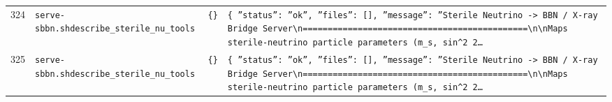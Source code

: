 \documentclass[11pt,a4paper]{article}
\begin{document}
\begin{longtable}{@{}p{}p{}p{}p{}@{}}
324 & \texttt{serve-sbbn.sh}\newline\texttt{describe\_\allowbreak{}sterile\_\allowbreak{}nu\_\allowbreak{}tools} & \texttt{\{\}\allowbreak{}} & \texttt{\{   ''status'':\allowbreak{} ''ok'',\allowbreak{}   ''files'':\allowbreak{} []\allowbreak{},\allowbreak{}   ''message'':\allowbreak{} ''Sterile Neutrino -\textgreater{}\allowbreak{} BBN /\allowbreak{} X-ray Bridge Server\textbackslash{}\allowbreak{}n=\allowbreak{}=\allowbreak{}=\allowbreak{}=\allowbreak{}=\allowbreak{}=\allowbreak{}=\allowbreak{}=\allowbreak{}=\allowbreak{}=\allowbreak{}=\allowbreak{}=\allowbreak{}=\allowbreak{}=\allowbreak{}=\allowbreak{}=\allowbreak{}=\allowbreak{}=\allowbreak{}=\allowbreak{}=\allowbreak{}=\allowbreak{}=\allowbreak{}=\allowbreak{}=\allowbreak{}=\allowbreak{}=\allowbreak{}=\allowbreak{}=\allowbreak{}=\allowbreak{}=\allowbreak{}=\allowbreak{}=\allowbreak{}=\allowbreak{}=\allowbreak{}=\allowbreak{}=\allowbreak{}=\allowbreak{}=\allowbreak{}=\allowbreak{}=\allowbreak{}=\allowbreak{}=\allowbreak{}=\allowbreak{}=\allowbreak{}=\allowbreak{}\textbackslash{}\allowbreak{}n\textbackslash{}\allowbreak{}nMaps sterile-neutrino particle parameters (m\_\allowbreak{}s,\allowbreak{} sin\textasciicircum{}\allowbreak{}2 2\ldots{}\allowbreak{}} \\
325 & \texttt{serve-sbbn.sh}\newline\texttt{describe\_\allowbreak{}sterile\_\allowbreak{}nu\_\allowbreak{}tools} & \texttt{\{\}\allowbreak{}} & \texttt{\{   ''status'':\allowbreak{} ''ok'',\allowbreak{}   ''files'':\allowbreak{} []\allowbreak{},\allowbreak{}   ''message'':\allowbreak{} ''Sterile Neutrino -\textgreater{}\allowbreak{} BBN /\allowbreak{} X-ray Bridge Server\textbackslash{}\allowbreak{}n=\allowbreak{}=\allowbreak{}=\allowbreak{}=\allowbreak{}=\allowbreak{}=\allowbreak{}=\allowbreak{}=\allowbreak{}=\allowbreak{}=\allowbreak{}=\allowbreak{}=\allowbreak{}=\allowbreak{}=\allowbreak{}=\allowbreak{}=\allowbreak{}=\allowbreak{}=\allowbreak{}=\allowbreak{}=\allowbreak{}=\allowbreak{}=\allowbreak{}=\allowbreak{}=\allowbreak{}=\allowbreak{}=\allowbreak{}=\allowbreak{}=\allowbreak{}=\allowbreak{}=\allowbreak{}=\allowbreak{}=\allowbreak{}=\allowbreak{}=\allowbreak{}=\allowbreak{}=\allowbreak{}=\allowbreak{}=\allowbreak{}=\allowbreak{}=\allowbreak{}=\allowbreak{}=\allowbreak{}=\allowbreak{}=\allowbreak{}=\allowbreak{}\textbackslash{}\allowbreak{}n\textbackslash{}\allowbreak{}nMaps sterile-neutrino particle parameters (m\_\allowbreak{}s,\allowbreak{} sin\textasciicircum{}\allowbreak{}2 2\ldots{}\allowbreak{}} \\

\end{longtable}
\end{document}
